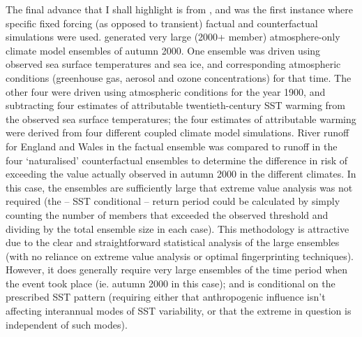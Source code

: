     The final advance that I shall highlight is from \citet{pall_anthropogenic_2011}, and was the first instance where specific fixed forcing (as opposed to transient) factual and counterfactual simulations were used. \citeauthor{pall_anthropogenic_2011} generated very large (2000+ member) atmosphere-only climate model ensembles of autumn 2000. One ensemble was driven using observed sea surface temperatures and sea ice, and corresponding atmospheric conditions (greenhouse gas, aerosol and ozone concentrations) for that time. The other four were driven using atmospheric conditions for the year 1900, and subtracting four estimates of attributable twentieth-century SST warming from the observed sea surface temperatures; the four estimates of attributable warming were derived from four different coupled climate model simulations. River runoff for England and Wales in the factual ensemble was compared to runoff in the four `naturalised' counterfactual ensembles to determine the difference in risk of exceeding the value actually observed in autumn 2000 in the different climates. In this case, the ensembles are sufficiently large that extreme value analysis was not required (the -- SST conditional -- return period could be calculated by simply counting the number of members that exceeded the observed threshold and dividing by the total ensemble size in each case). This methodology is attractive due to the clear and straightforward statistical analysis of the large ensembles (with no reliance on extreme value analysis or optimal fingerprinting techniques). However, it does generally require very large ensembles of the time period when the event took place (ie. autumn 2000 in this case); and is conditional on the prescribed SST pattern (requiring either that anthropogenic influence isn't affecting interannual modes of SST variability, or that the extreme in question is independent of such modes).

